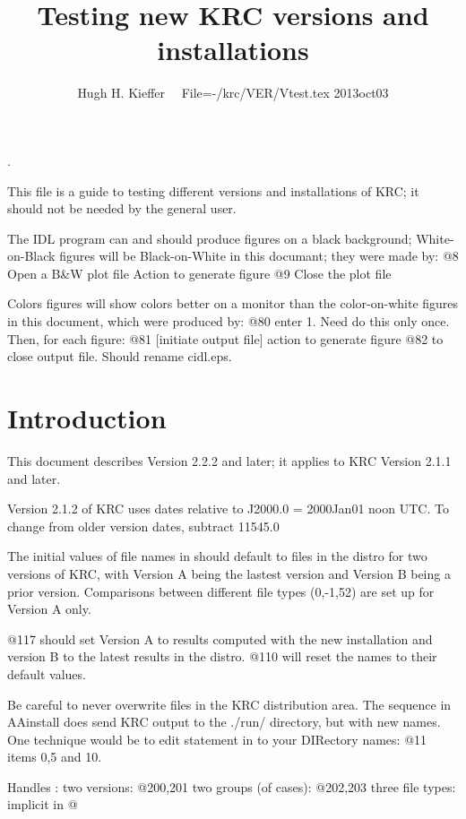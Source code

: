 \documentclass{article}  %
\title{Testing new KRC versions and installations}
\author{Hugh H. Kieffer  \ \ File=-/krc/VER/Vtest.tex 2013oct03}
\begin{document}
\maketitle
\tableofcontents
\hrulefill .\hrulefill

This file is a guide to testing different versions and installations of KRC; it should not be
needed by the general user.

The IDL program can and should produce figures on a black background; White-on-Black figures will be Black-on-White in this documant; they were made by:
\qi @8 Open a B\&W  plot file
\qii  Action to generate figure
\qi @9 Close the plot file
 
Colors figures will show colors better on a monitor than the color-on-white figures in this document, which were produced by:
\qi @80  enter 1.  Need do this only once.  Then, for each figure:
\qi @81 [initiate output file]
\qi  action to generate figure
\qi @82  to close output file. Should rename cidl.eps.

\section{Introduction} 
This document describes Version 2.2.2 and later; it applies to KRC Version 2.1.1
and later.

Version 2.1.2 of KRC uses dates relative to J2000.0 = 2000Jan01 noon UTC. To
change from older version dates, subtract 11545.0

The initial values of file names in  should default to files in the
distro for two versions of KRC, with Version A being the lastest version and
Version B being a prior version.  Comparisons between different file types
(0,-1,52) are set up for Version A only.

 @117 should set Version A to results computed with the new installation and
 version B to the latest results in the distro. @110 will reset the names to
 their default values.

Be careful to never overwrite files in the KRC distribution area. The sequence
in AAinstall does send KRC output to the ./run/ directory, but with new
names. One technique would be to edit \nv{parf=[...} statement in
   to your DIRectory names: @11 items 0,5 and 10.

Handles :
\qi two versions:   @200,201
\qi two groups (of cases): @202,203
\qi three file types: implicit in @
\end{document}
